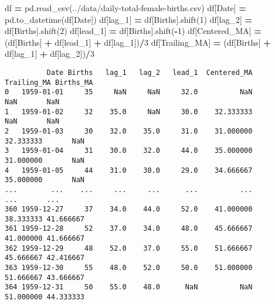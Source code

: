 \documentclass[
]{book}
\newenvironment{Shaded}{\begin{snugshade}}{\end{snugshade}}
\newcommand{\DecValTok}[1]{\textcolor[rgb]{0.00,0.00,0.81}{#1}}
\newcommand{\NormalTok}[1]{#1}
\newcommand{\OperatorTok}[1]{\textcolor[rgb]{0.81,0.36,0.00}{\textbf{#1}}}
\newcommand{\StringTok}[1]{\textcolor[rgb]{0.31,0.60,0.02}{#1}}
\begin{document}
\begin{Shaded}
\begin{Highlighting}[]
\NormalTok{df }\OperatorTok{=}\NormalTok{ pd.read\_csv(}\StringTok{\textquotesingle{}../data/daily{-}total{-}female{-}births.csv\textquotesingle{}}\NormalTok{)}
\NormalTok{df[}\StringTok{\textquotesingle{}Date\textquotesingle{}}\NormalTok{] }\OperatorTok{=}\NormalTok{ pd.to\_datetime(df[}\StringTok{\textquotesingle{}Date\textquotesingle{}}\NormalTok{])}
\NormalTok{df[}\StringTok{\textquotesingle{}lag\_1\textquotesingle{}}\NormalTok{] }\OperatorTok{=}\NormalTok{ df[}\StringTok{\textquotesingle{}Births\textquotesingle{}}\NormalTok{].shift(}\DecValTok{1}\NormalTok{)}
\NormalTok{df[}\StringTok{\textquotesingle{}lag\_2\textquotesingle{}}\NormalTok{] }\OperatorTok{=}\NormalTok{ df[}\StringTok{\textquotesingle{}Births\textquotesingle{}}\NormalTok{].shift(}\DecValTok{2}\NormalTok{)}
\NormalTok{df[}\StringTok{\textquotesingle{}lead\_1\textquotesingle{}}\NormalTok{] }\OperatorTok{=}\NormalTok{ df[}\StringTok{\textquotesingle{}Births\textquotesingle{}}\NormalTok{].shift(}\OperatorTok{{-}}\DecValTok{1}\NormalTok{)}
\NormalTok{df[}\StringTok{\textquotesingle{}Centered\_MA\textquotesingle{}}\NormalTok{] }\OperatorTok{=}\NormalTok{ (df[}\StringTok{\textquotesingle{}Births\textquotesingle{}}\NormalTok{] }\OperatorTok{+}\NormalTok{ df[}\StringTok{\textquotesingle{}lead\_1\textquotesingle{}}\NormalTok{] }\OperatorTok{+}\NormalTok{ df[}\StringTok{\textquotesingle{}lag\_1\textquotesingle{}}\NormalTok{])}\OperatorTok{/}\DecValTok{3}
\NormalTok{df[}\StringTok{\textquotesingle{}Trailing\_MA\textquotesingle{}}\NormalTok{] }\OperatorTok{=}\NormalTok{ (df[}\StringTok{\textquotesingle{}Births\textquotesingle{}}\NormalTok{] }\OperatorTok{+}\NormalTok{ df[}\StringTok{\textquotesingle{}lag\_1\textquotesingle{}}\NormalTok{] }\OperatorTok{+}\NormalTok{ df[}\StringTok{\textquotesingle{}lag\_2\textquotesingle{}}\NormalTok{])}\OperatorTok{/}\DecValTok{3}
\end{Highlighting}
\end{Shaded}

\begin{verbatim}
          Date Births   lag_1   lag_2   lead_1  Centered_MA Trailing_MA Births_MA
0   1959-01-01     35     NaN     NaN     32.0          NaN         NaN       NaN
1   1959-01-02     32    35.0     NaN     30.0    32.333333         NaN       NaN
2   1959-01-03     30    32.0    35.0     31.0    31.000000   32.333333       NaN
3   1959-01-04     31    30.0    32.0     44.0    35.000000   31.000000       NaN
4   1959-01-05     44    31.0    30.0     29.0    34.666667   35.000000       NaN
...        ...    ...     ...     ...      ...          ...         ...       ...
360 1959-12-27     37    34.0    44.0     52.0    41.000000   38.333333 41.666667
361 1959-12-28     52    37.0    34.0     48.0    45.666667   41.000000 41.666667
362 1959-12-29     48    52.0    37.0     55.0    51.666667   45.666667 42.416667
363 1959-12-30     55    48.0    52.0     50.0    51.000000   51.666667 43.666667
364 1959-12-31     50    55.0    48.0      NaN          NaN   51.000000 44.333333
\end{verbatim}
\end{document}
